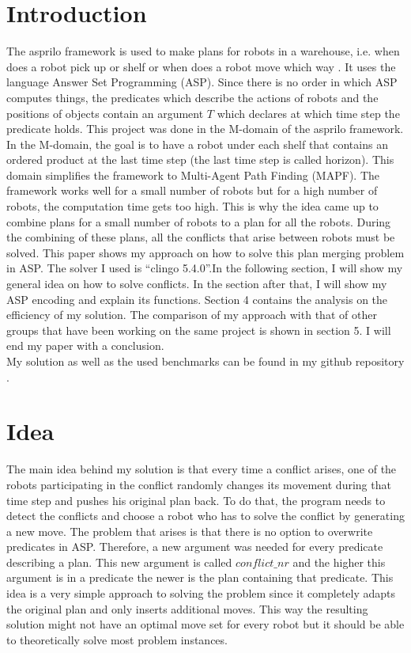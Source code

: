 \documentclass[runningheads]{llncs}
\begin{document}
\section{Introduction}
The asprilo framework is used to make plans for robots in a warehouse, i.e. when does a robot pick up or shelf or when does a robot move which way \cite{asprilo}. 
It uses the language Answer Set Programming (ASP). Since there is no order in which ASP computes things, the predicates which describe the actions of robots and
the positions of objects contain an argument $T$ which declares at which time step the predicate holds. This project was done in the M-domain of the asprilo framework.
In the M-domain, the goal is to have a robot under each shelf that contains an ordered product at the last time step (the last time step is called horizon). This domain simplifies the framework 
to Multi-Agent Path Finding (MAPF). The framework works well for a small number of robots but for a high number of robots, the computation time gets too high. This is
why the idea came up to combine plans for a small number of robots to a plan for all the robots. During the combining of these plans, all the conflicts that arise between 
robots must be solved. This paper shows my approach on how to solve this plan merging problem in ASP. The solver I used is ``clingo 5.4.0''.In the following section, I will show my general idea on how to solve 
conflicts. In the section after that, I will show my ASP encoding and explain its functions. Section 4 contains the analysis on the efficiency of my solution. The comparison of my approach with that of other groups that have
been working on the same project is shown in section 5. I will end my paper with a conclusion. \\
My solution as well as the used benchmarks can be found in my github repository \cite{owngithub}.


\section{Idea}
The main idea behind my solution is that every time a conflict arises, one of the robots participating in the conflict randomly changes its movement during that time step and pushes his original plan back. 
To do that, the program needs to detect the conflicts and choose a robot who has to solve the conflict by generating a new move. The problem that arises is that
there is no option to overwrite predicates in ASP. Therefore, a new argument was needed for every predicate describing a plan. This new argument is called $conflict\_nr$ and 
the higher this argument is in a predicate the newer is the plan containing that predicate. This idea is a very simple approach to solving the problem since it completely adapts the original plan and only
inserts additional moves. This way the resulting solution might not have an optimal move set for every robot but it should be able to theoretically solve most problem instances. 
\end{document}
